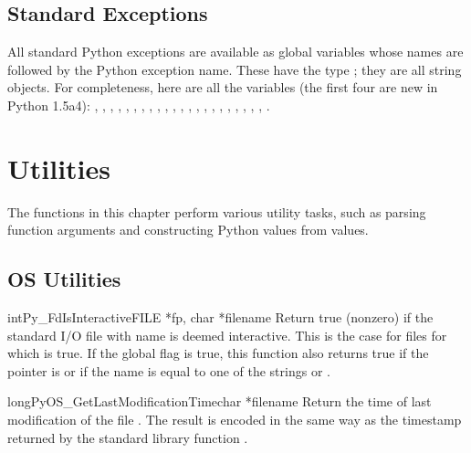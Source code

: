 \documentclass[twoside,openright]{report}
\begin{document}
\section{Standard Exceptions}

All standard Python exceptions are available as global variables whose
names are  followed by the Python exception name.
These have the type ; they are all string objects.
For completeness, here are all the variables (the first four are new
in Python 1.5a4):
,
,
,
,
,
,
,
,
,
,
,
,
,
,
,
,
,
,
,
,
,
,
.


\chapter{Utilities}

The functions in this chapter perform various utility tasks, such as
parsing function arguments and constructing Python values from \C{}
values.

\section{OS Utilities}

\begin{cfuncdesc}{int}{Py_FdIsInteractive}{FILE *fp, char *filename}
Return true (nonzero) if the standard I/O file  with name
 is deemed interactive.  This is the case for files for
which  is true.  If the global flag
 is true, this function also returns true if
the  pointer is \NULL{} or if the name is equal to one of
the strings  or .
\end{cfuncdesc}

\begin{cfuncdesc}{long}{PyOS_GetLastModificationTime}{char *filename}
Return the time of last modification of the file .
The result is encoded in the same way as the timestamp returned by
the standard \C{} library function .
\end{cfuncdesc}
\end{document}
